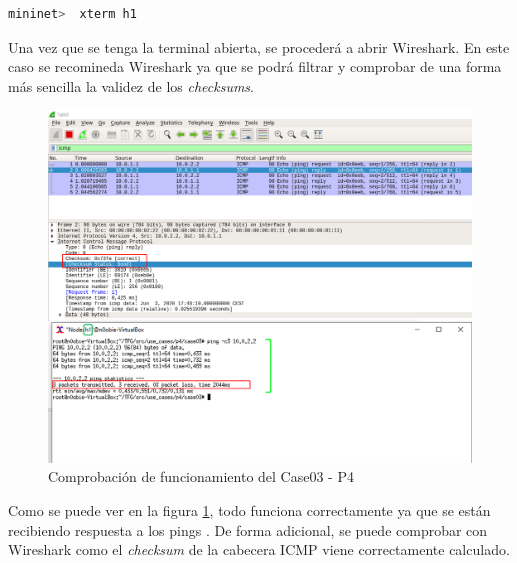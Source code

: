 \begin{lstlisting}[language= bash, style=Consola, caption={Comprobación de funcionamiento - Case03},label=code:case03_p4_ether_func]
    mininet>  xterm h1
\end{lstlisting}
\vspace{0.5cm}

Una vez que se tenga la terminal abierta, se procederá a abrir Wireshark. En este caso se recomineda Wireshark ya que se podrá filtrar y comprobar de una forma más sencilla la validez de los \textit{checksums}.

\begin{figure}[ht]
    \centering
    \includegraphics[width=15.5cm]{archivos/img/dev/p4/case03/demo_case03_edited.png}
    \caption{Comprobación de funcionamiento del Case03 - P4}
    \label{fig:case03_p4_ether_func1}
\end{figure}

Como se puede ver en la figura \ref{fig:case03_p4_ether_func1}, todo funciona correctamente ya que se están recibiendo respuesta a los pings \hspace{1mm}. De forma adicional, se puede comprobar con Wireshark como el \textit{checksum} de la cabecera ICMP viene correctamente calculado.


